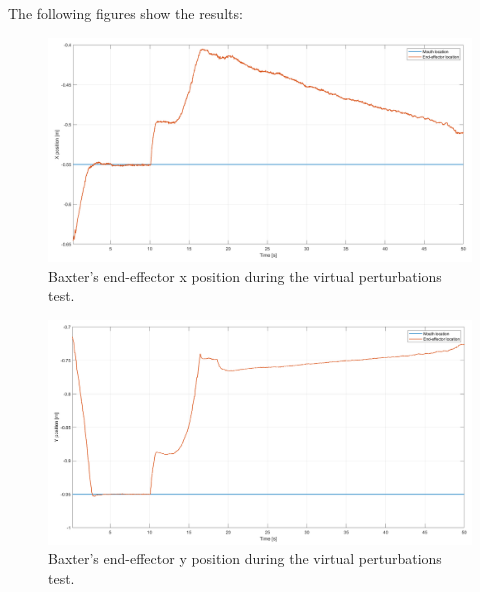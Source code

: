 \documentclass[11pt]{report} %
\begin{document}
The following figures show the results:

\begin{figure}[H]
    \centering
    \includegraphics[width=1.0\linewidth]{assets/imgs/control_theory/mpc_regulation_virtual_perturbations/x_pose.png}
    \caption{Baxter's end-effector x position during the virtual perturbations test.} 
    \label{fig_baxter_x_pose_mpc_virtual_perturbations_experiments}
\end{figure}

\begin{figure}[H]
    \centering
    \includegraphics[width=1.0\linewidth]{assets/imgs/control_theory/mpc_regulation_virtual_perturbations/y_pose.png}
    \caption{Baxter's end-effector y position during the virtual perturbations test.} 
    \label{fig_baxter_y_pose_mpc_virtual_perturbations_experiments}
\end{figure}
\end{document}
